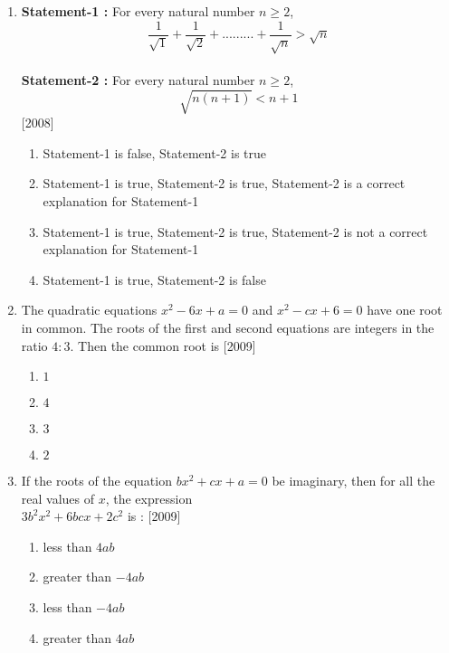 \documentclass[journal,12pt,twocolumn]{IEEEtran}
\theoremstyle{remark}
\begin{document}
\begin{enumerate}
\begin{enumerate}
\end{enumerate}

\item \textbf{Statement-1 :} For every natural number $n\geq 2$,\\
$$\frac{1}{\sqrt{1}} + \frac{1}{\sqrt{2}} + ......... + \frac{1}{\sqrt{n}} > \sqrt{n}$$\\
\textbf{Statement-2 :} For every natural number $n\geq 2$,\\
$$\sqrt{n(n + 1)} < n + 1$$
\hfill[2008]\\

\begin{enumerate}

	\item  Statement-1 is false, Statement-2 is true
	\item  Statement-1 is true, Statement-2 is true, Statement-2 is a correct explanation for Statement-1
	\item  Statement-1 is true, Statement-2 is true, Statement-2 is not a correct explanation for Statement-1
	\item  Statement-1 is true, Statement-2 is false

\end{enumerate}

\item The quadratic equations $x^2 - 6x + a = 0$ and $x^2 - cx + 6 = 0$ have one root in common. The roots of the first and second equations are integers in the ratio $4 : 3$. Then the common root is
\hfill[2009]

\begin{enumerate}

	\item  $1$
	\item  $4$
	\item  $3$
	\item  $2$

\end{enumerate}

\item If the roots of the equation $bx^2 + cx + a = 0$ be imaginary, then for all the real values of $x$, the expression\\
$3b^2x^2 + 6bcx + 2c^2$ is :
\hfill[2009]

\begin{enumerate}

	\item  less than $4ab$
	\item  greater than $-4ab$
	\item  less than $-4ab$
	\item  greater than $4ab$


\end{enumerate}
\end{enumerate}
\end{document}
